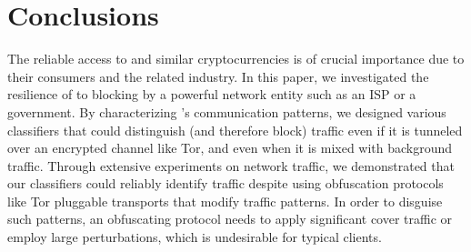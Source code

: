 \section{Conclusions}

The reliable access to \bc and similar cryptocurrencies is of crucial importance due to
their consumers and the related industry. 
In this paper, we investigated the resilience of \bc to blocking by a powerful network entity such as an ISP or a government.
By characterizing \bc's communication patterns, we designed 
various classifiers that could distinguish (and therefore block) \bc traffic 
even if it is tunneled over an encrypted channel like Tor, 
and even when it is mixed with background traffic. Through extensive experiments on network traffic, we demonstrated that our classifiers could reliably identify \bc traffic despite using obfuscation protocols like Tor pluggable transports that modify traffic patterns. In order to disguise such patterns, an obfuscating protocol needs to apply significant cover traffic or employ large perturbations, which is undesirable for typical clients. 

 


